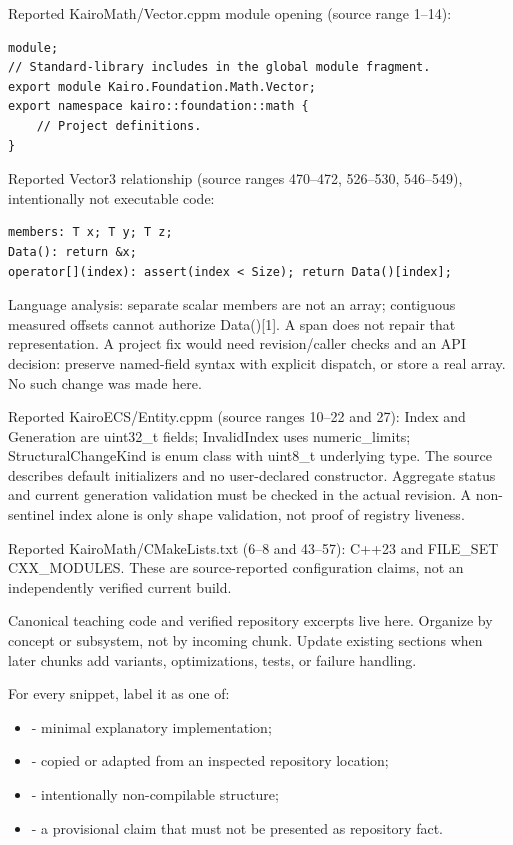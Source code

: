 Reported KairoMath/Vector.cppm module opening (source range 1--14):

\begin{verbatim}
module;
// Standard-library includes in the global module fragment.
export module Kairo.Foundation.Math.Vector;
export namespace kairo::foundation::math {
    // Project definitions.
}
\end{verbatim}

Reported Vector3 relationship (source ranges 470--472, 526--530, 546--549), intentionally not executable code:

\begin{verbatim}
members: T x; T y; T z;
Data(): return &x;
operator[](index): assert(index < Size); return Data()[index];
\end{verbatim}

Language analysis: separate scalar members are not an array; contiguous measured offsets cannot authorize Data(){[}1{]}. A span does not repair that representation. A project fix would need revision/caller checks and an API decision: preserve named-field syntax with explicit dispatch, or store a real array. No such change was made here.

Reported KairoECS/Entity.cppm (source ranges 10--22 and 27): Index and Generation are uint32\_t fields; InvalidIndex uses numeric\_limits; StructuralChangeKind is enum class with uint8\_t underlying type. The source describes default initializers and no user-declared constructor. Aggregate status and current generation validation must be checked in the actual revision. A non-sentinel index alone is only shape validation, not proof of registry liveness.

Reported KairoMath/CMakeLists.txt (6--8 and 43--57): C++23 and FILE\_SET CXX\_MODULES. These are source-reported configuration claims, not an independently verified current build.

Canonical teaching code and verified repository excerpts live here. Organize by concept or subsystem, not by incoming chunk. Update existing sections when later chunks add variants, optimizations, tests, or failure handling.

For every snippet, label it as one of:

\begin{itemize}
\tightlist
\item
   - minimal explanatory implementation;
\item
   - copied or adapted from an inspected repository location;
\item
   - intentionally non-compilable structure;
\item
   - a provisional claim that must not be presented as repository fact.
\end{itemize}

